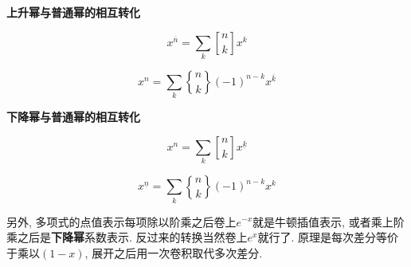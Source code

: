 \textbf{上升幂与普通幂的相互转化}

$$ x^{\overline{n}}=\sum_{k} {n \brack k} x^k $$

$$ x^n=\sum_{k} {n \brace k} (-1)^{n-k} x^{\overline{k}} $$

\textbf{下降幂与普通幂的相互转化}

$$ x^n=\sum_{k} {n \brack k} x^{\underline{k}} $$

$$ x^{\underline{n}}=\sum_{k} {n \brace k} (-1)^{n-k} x^k $$

另外, 多项式的点值表示每项除以阶乘之后卷上$e^{-x}$就是牛顿插值表示, 或者乘上阶乘之后是\textbf{下降幂}系数表示. 反过来的转换当然卷上$e^x$就行了. 原理是每次差分等价于乘以$(1 - x)$, 展开之后用一次卷积取代多次差分.